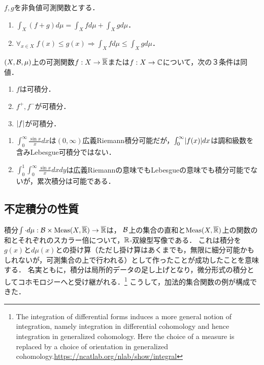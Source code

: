 \documentclass[uplatex, dvipdfmx]{jsreport}
\begin{document}
\begin{lemma}[非負値可測関数の紡ぐ論理]\label{lemma-integral-for-nonnegative-measurables}
    $f,g$を非負値可測関数とする．
    \begin{enumerate}
        \item $\int_X(f+g)d\mu=\int_Xfd\mu+\int_Xgd\mu$．
        \item $\forall_{x\in X}\;f(x)\le g(x)\Rightarrow\int_Xfd\mu\le\int_Xgd\mu$．
    \end{enumerate}
\end{lemma}

\begin{theorem}[可積分性の特徴付け]\label{thm-characterization-of-integrability}
    $(X,\mathcal{B},\mu)$上の可測関数$f:X\to\overline{\mathbb{R}}$または$f:X\to\mathbb{C}$について，次の３条件は同値．
    \begin{enumerate}
        \item $f$は可積分．
        \item $f^+,f^-$が可積分．
        \item $\lvert f\rvert$が可積分．
    \end{enumerate}
\end{theorem}

\begin{remark}[Lebesgue可積分性と広義Riemann積分]\mbox{}\label{remark-Lebesgue-integral-and-Riemann-integral}
    \begin{enumerate}
        \item $\int^\infty_0\frac{\sin x}{x}dx$は$(0,\infty)$広義Riemann積分可能だが，$\int^\infty_0\lvert f(x)\rvert dx$は調和級数を含みLebesgue可積分ではない．
        \item $\int^1_0\int^\infty_0\frac{\sin x}{x}dxdy$は広義Riemannの意味でもLebesgueの意味でも積分可能でないが，累次積分は可能である．
    \end{enumerate}
\end{remark}

\subsection{不定積分の性質}

\begin{tcolorbox}[colframe=ForestGreen, colback=ForestGreen!10!white,breakable,colbacktitle=ForestGreen!40!white,coltitle=black,fonttitle=\bfseries\sffamily,
title=]
    積分$\int\cdot d\mu:\mathcal{B}\times\mathrm{Meas}(X,\overline{\mathbb{R}})\to\overline{\mathbb{R}}$は，
    $\mathcal{B}$上の集合の直和と$\mathrm{Meas}(X,\overline{\mathbb{R}})$上の関数の和とそれぞれのスカラー倍について，$\mathbb{R}$-双線型写像である．
    これは積分を$g(x)$と$d\mu(x)$との掛け算（ただし掛け算はあくまでも，無限に細分可能かもしれないが，可測集合の上で行われる）として作ったことが成功したことを意味する．
    名実ともに，積分は局所的データの足し上げとなり，微分形式の積分としてコホモロジーへと受け継がれる．\footnote{The integration of differential forms induces a more general notion of integration, namely integration in differential cohomology and hence integration in generalized cohomology. Here the choice of a measure is replaced by a choice of orientation in generalized cohomology.\url{https://ncatlab.org/nlab/show/integral}}
    こうして，加法的集合関数の例が構成できた．
\end{tcolorbox}
\end{document}
